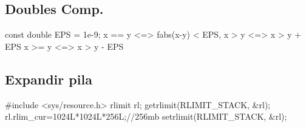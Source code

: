 \subsection*{Doubles Comp.}
\begin{code}
const double EPS = 1e-9;
x == y	<=> fabs(x-y) < EPS, x >  y	<=> x > y + EPS
x >= y	<=> x > y - EPS
\end{code}
\subsection*{Expandir pila}
\begin{code}
#include <sys/resource.h>
rlimit rl;
getrlimit(RLIMIT_STACK, &rl);
rl.rlim_cur=1024L*1024L*256L;//256mb
setrlimit(RLIMIT_STACK, &rl);
\end{code}
